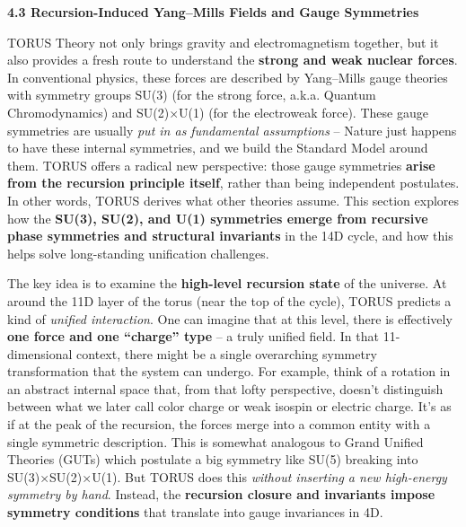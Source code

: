 \documentclass[
]{article}
\begin{document}
\textbf{4.3 Recursion-Induced Yang--Mills Fields and Gauge Symmetries}

TORUS Theory not only brings gravity and electromagnetism together, but
it also provides a fresh route to understand the \textbf{strong and weak
nuclear forces}. In conventional physics, these forces are described by
Yang--Mills gauge theories with symmetry groups SU(3) (for the strong
force, a.k.a. Quantum Chromodynamics) and SU(2)×U(1) (for the
electroweak force). These gauge symmetries are usually \emph{put in as
fundamental assumptions} -- Nature just happens to have these internal
symmetries, and we build the Standard Model around them. TORUS offers a
radical new perspective: those gauge symmetries \textbf{arise from the
recursion principle itself}, rather than being independent postulates.
In other words, TORUS derives what other theories assume. This section
explores how the \textbf{SU(3), SU(2), and U(1) symmetries emerge from
recursive phase symmetries and structural invariants} in the 14D cycle,
and how this helps solve long-standing unification challenges.

The key idea is to examine the \textbf{high-level recursion state} of
the universe. At around the 11D layer of the torus (near the top of the
cycle), TORUS predicts a kind of \emph{unified interaction}. One can
imagine that at this level, there is effectively \textbf{one force and
one ``charge'' type} -- a truly unified field. In that 11-dimensional
context, there might be a single overarching symmetry transformation
that the system can undergo. For example, think of a rotation in an
abstract internal space that, from that lofty perspective, doesn't
distinguish between what we later call color charge or weak isospin or
electric charge\hspace{0pt}. It's as if at the peak of the recursion,
the forces merge into a common entity with a single symmetric
description. This is somewhat analogous to Grand Unified Theories (GUTs)
which postulate a big symmetry like SU(5) breaking into
SU(3)×SU(2)×U(1). But TORUS does this \emph{without inserting a new
high-energy symmetry by hand}. Instead, the \textbf{recursion closure
and invariants impose symmetry conditions} that translate into gauge
invariances in 4D\hspace{0pt}.
\end{document}
